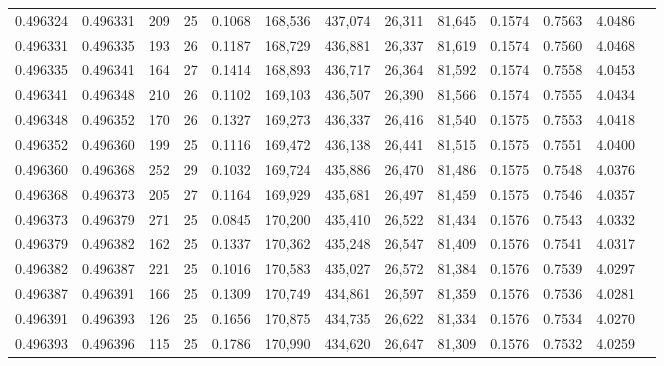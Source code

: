 \begin{tabular}{rrrrrrrrrrrrr}
0.496324 & 0.496331 & 209 &  25 &                                     0.1068 & 168,536 & 437,074 &  26,311 &  81,645 & 0.1574 & 0.7563 & 4.0486 \\
0.496331 & 0.496335 & 193 &  26 &                                     0.1187 & 168,729 & 436,881 &  26,337 &  81,619 & 0.1574 & 0.7560 & 4.0468 \\
0.496335 & 0.496341 & 164 &  27 &                                     0.1414 & 168,893 & 436,717 &  26,364 &  81,592 & 0.1574 & 0.7558 & 4.0453 \\
0.496341 & 0.496348 & 210 &  26 &                                     0.1102 & 169,103 & 436,507 &  26,390 &  81,566 & 0.1574 & 0.7555 & 4.0434 \\
0.496348 & 0.496352 & 170 &  26 &                                     0.1327 & 169,273 & 436,337 &  26,416 &  81,540 & 0.1575 & 0.7553 & 4.0418 \\
0.496352 & 0.496360 & 199 &  25 &                                     0.1116 & 169,472 & 436,138 &  26,441 &  81,515 & 0.1575 & 0.7551 & 4.0400 \\
0.496360 & 0.496368 & 252 &  29 &                                     0.1032 & 169,724 & 435,886 &  26,470 &  81,486 & 0.1575 & 0.7548 & 4.0376 \\
0.496368 & 0.496373 & 205 &  27 &                                     0.1164 & 169,929 & 435,681 &  26,497 &  81,459 & 0.1575 & 0.7546 & 4.0357 \\
0.496373 & 0.496379 & 271 &  25 &                                     0.0845 & 170,200 & 435,410 &  26,522 &  81,434 & 0.1576 & 0.7543 & 4.0332 \\
0.496379 & 0.496382 & 162 &  25 &                                     0.1337 & 170,362 & 435,248 &  26,547 &  81,409 & 0.1576 & 0.7541 & 4.0317 \\
0.496382 & 0.496387 & 221 &  25 &                                     0.1016 & 170,583 & 435,027 &  26,572 &  81,384 & 0.1576 & 0.7539 & 4.0297 \\
0.496387 & 0.496391 & 166 &  25 &                                     0.1309 & 170,749 & 434,861 &  26,597 &  81,359 & 0.1576 & 0.7536 & 4.0281 \\
0.496391 & 0.496393 & 126 &  25 &                                     0.1656 & 170,875 & 434,735 &  26,622 &  81,334 & 0.1576 & 0.7534 & 4.0270 \\
0.496393 & 0.496396 & 115 &  25 &                                     0.1786 & 170,990 & 434,620 &  26,647 &  81,309 & 0.1576 & 0.7532 & 4.0259 \\

\end{tabular}
